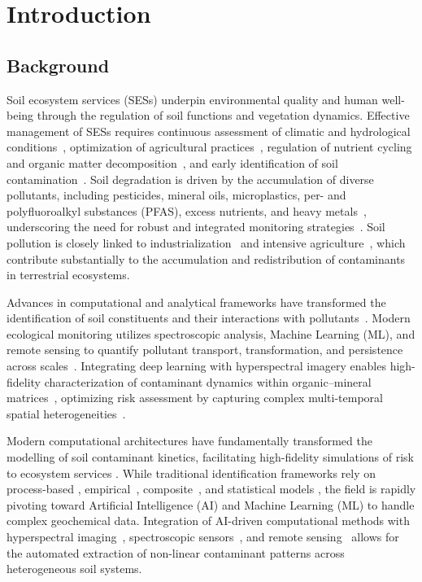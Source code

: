 \documentclass[environremediat,article,accept,pdftex,oneauthor]{Definitions/mdpi}
\begin{document}
\section{Introduction}\label{sec1}

\subsection{Background}\label{sec1.1}

{Soil ecosystem services (SESs) underpin environmental quality and human well-being through the regulation of soil functions and vegetation dynamics.} Effective management of SESs requires continuous assessment of climatic and hydrological conditions~\cite{Lal2020,Robinson2014}, optimization of agricultural practices~\cite{Hepperly2009}, regulation of nutrient cycling and organic matter decomposition~\cite{Atoloye2024,Ma2024,Vishwanath2025}, and early identification of soil contamination~\cite{Pan2019,Lemenkova2025b,Proshad2025}. {Soil degradation is driven by the accumulation of diverse pollutants, including pesticides, mineral oils, microplastics, per- and polyfluoroalkyl substances (PFAS), excess nutrients, and heavy metals~\cite{Shen2024,Guan2024,Baghaie2020,Luo2017}, underscoring the need for robust and integrated monitoring strategies~\cite{Liu2020,Lemenkova2025d}.} Soil pollution is closely linked to industrialization~\cite{Rosskopfova2012,Guo2025} and intensive agriculture~\cite{Hepperly2009}, which contribute substantially to the accumulation and redistribution of contaminants in terrestrial ecosystems.

Advances in computational and analytical frameworks have {transformed} the identification of soil constituents and their interactions with pollutants~\cite{Liu2020}. Modern ecological monitoring utilizes spectroscopic analysis, Machine Learning (ML), and remote sensing to quantify pollutant transport, transformation, and persistence across scales~\cite{Padarian}. Integrating deep learning with hyperspectral imagery enables high-fidelity characterization of contaminant dynamics within organic--mineral matrices~\cite{Xu2026}, optimizing risk assessment by capturing complex multi-temporal spatial heterogeneities~\cite{Proshad2025}.

Modern computational architectures have fundamentally transformed the
modelling of soil contaminant kinetics, facilitating high-fidelity simulations
of risk to ecosystem services
 \cite{Liu2020,Proshad2025}. While traditional
identification frameworks rely on process-based
\cite{Giannakis2017}, empirical~\cite{Benavidez2018,Lal2020},
composite~\cite{Sadhukhan2022}, and statistical models
\cite{Dadi,Lemenkova2024b}, the field is rapidly pivoting toward
Artificial Intelligence (AI) and Machine Learning (ML) to handle complex
geochemical data. Integration of AI-driven computational methods
\cite{Proshad2025} with hyperspectral \mbox{imaging
\cite{Wei},} spectroscopic sensors~\cite{Xu2026,Guo2025}, and
remote \mbox{sensing~\cite{Wang,Lemenkova2025b}} allows for the automated
extraction of non-linear contaminant patterns across heterogeneous soil
systems.
\end{document}
